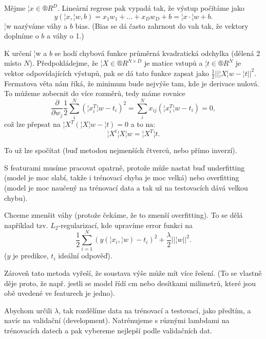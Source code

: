 \documentclass[12pt]{article}					%
\begin{document}
\begin{definice}
	Mějme $¦x \in ®R^D$. Lineární regrese pak vypadá tak, že výstup počítáme jako
	$$ y\left(¦x, ¦w, b\right) = x_1w_1 + … + x_Dw_D + b = ¦x·¦w + b. $$
	¦w nazýváme váhy a $b$ bias. (Bias se dá často zahrnout do vah tak, že vektory doplníme o $b$ a váhy o 1.)

	K určení ¦w a $b$ se hodí chybová funkce průměrná kvadratická odchylka (dělená 2 místo $N$). Předpokládejme, že $¦X \in ®R^{N\times D}$ je matice vstupů a $¦t \in ®R^N$ je vektor odpovídajících výstupů, pak se dá tato funkce zapsat jako $\frac{1}{2}||¦X¦w - ¦t||^2$. Fermatova věta nám říká, že minimum bude nejvýše tam, kde je derivace nulová. To můžeme zobecnit do více rozměrů, tedy máme rovnice
	$$ \frac{\partial}{\partial w_j}\frac{1}{2} \sum_i^N\left(¦x_i^T¦w - t_i\right)^2 = \sum_i^N x_{ij}\left(¦x_i^T¦w - t_i\right) = 0, $$
	což lze přepsat na $¦X^T\left(¦X¦w - ¦t\right) = 0 $ a to na:
	$$ ¦X^t¦X¦w = ¦X^T¦t. $$
	
	To už lze spočítat (buď metodou nejmenších čtverců, nebo přímo inverzí).
\end{definice}

\begin{poznamka}
	S featurami musíme pracovat opatrně, protože může nastat buď underfitting (model je moc slabí, takže i trénovací chyba je moc velká) nebo overfitting (model je moc naučený na trénovací data a tak už na testovacích dává velkou chybu).
\end{poznamka}


\begin{definice}[Regularizace]
	Chceme zmenšit váhy (protože čekáme, že to zmenší overfitting). To se dělá například tzv. $L_2$-regularizací, kde upravíme error funkci na
	$$ \frac{1}{2}\sum_{i=1}^N (y(¦x_i, ¦w) - t_i)^2 + \frac{\lambda}{2}||¦w||^2. $$
	($y$ je predikce, $t_i$ ideální odpověď).

	Zároveň tato metoda vyřeší, že soustava výše může mít více řešení. (To se vlastně děje proto, že např. jestli se model řídí cm nebo desítkami milimetrů, které jsou obě uvedené ve featurech je jedno).
\end{definice}

\begin{poznamka}
	Abychom určili $\lambda$, tak rozdělíme data na trénovací a testovací, jako předtím, a navíc na validační (development). Natrénujeme s různými lambdami na trénovacích datech a pak vybereme nejlepší podle validačních dat.
\end{poznamka}
\end{document}
